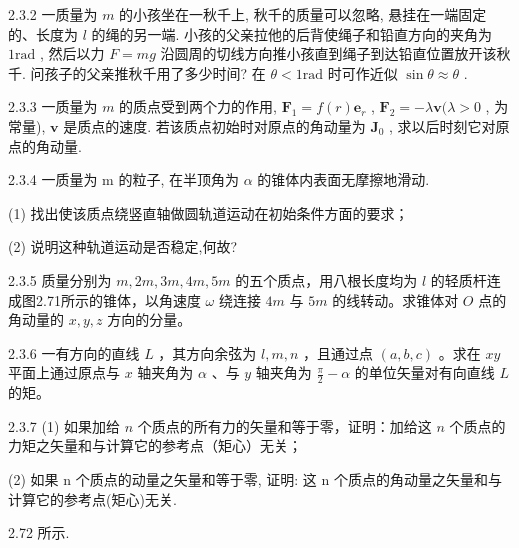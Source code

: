 \begin{problem}{2.3.2}
一质量为 $m$ 的小孩坐在一秋千上, 秋千的质量可以忽略, 悬挂在一端固定的、长度为 $l$ 的绳的另一端. 小孩的父亲拉他的后背使绳子和铅直方向的夹角为 $1\mathrm{rad}$ , 然后以力 $F = mg$ 沿圆周的切线方向推小孩直到绳子到达铅直位置放开该秋千. 问孩子的父亲推秋千用了多少时间? 在 $\theta < 1\mathrm{rad}$ 时可作近似 $\sin \theta \approx \theta$ .
\end{problem}
\clearpage


\begin{problem}{2.3.3}
一质量为 $m$ 的质点受到两个力的作用, $\bm{F}_1 = f(r)\bm{e}_r$ , $\bm{F}_2 = -\lambda \bm{v} (\lambda > 0$ , 为常量), $\bm{v}$ 是质点的速度. 若该质点初始时对原点的角动量为 $\bm{J}_0$ , 求以后时刻它对原点的角动量.
\end{problem}
\clearpage


\begin{problem}{2.3.4}
一质量为 m 的粒子, 在半顶角为 $\alpha$ 的锥体内表面无摩擦地滑动.

(1) 找出使该质点绕竖直轴做圆轨道运动在初始条件方面的要求；

(2) 说明这种轨道运动是否稳定,何故?
\end{problem}
\clearpage


\begin{problem}{2.3.5}
质量分别为 $m, 2m, 3m, 4m, 5m$ 的五个质点，用八根长度均为 $l$ 的轻质杆连成图2.71所示的锥体，以角速度 $\omega$ 绕连接 $4m$ 与 $5m$ 的线转动。求锥体对 $O$ 点的角动量的 $x, y, z$ 方向的分量。
\begin{center}

\end{center}
\end{problem}
\clearpage


\begin{problem}{2.3.6}
一有方向的直线 $L$ ，其方向余弦为 $l, m, n$ ，且通过点 $(a, b, c)$ 。求在 $xy$ 平面上通过原点与 $x$ 轴夹角为 $\alpha$ 、与 $y$ 轴夹角为 $\frac{\pi}{2} - \alpha$ 的单位矢量对有向直线 $L$ 的矩。
\end{problem}
\clearpage


\begin{problem}{2.3.7}
(1) 如果加给 $n$ 个质点的所有力的矢量和等于零，证明：加给这 $n$ 个质点的力矩之矢量和与计算它的参考点（矩心）无关；

(2) 如果 n 个质点的动量之矢量和等于零, 证明: 这 n 个质点的角动量之矢量和与计算它的参考点(矩心)无关.

2.72 所示.
\end{problem}
\clearpage


